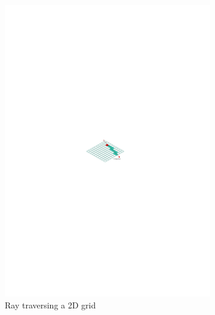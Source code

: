 \begin{figure}
\centering
\begin{subfigure}{.33\textwidth}
  \centering
  \includegraphics[scale=1]{figures/dda.pdf}
  \caption{Ray traversing a 2D grid}
  \label{fig:dda}
\end{subfigure}%
\begin{subfigure}{.33\textwidth}
  \centering

\end{subfigure}
\end{figure}
